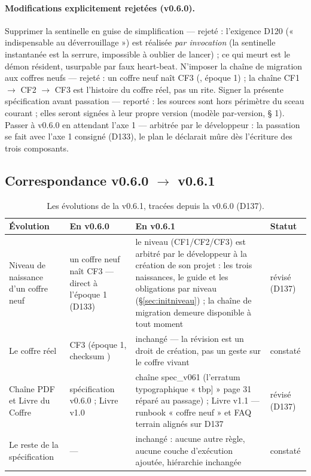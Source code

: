 \paragraph{Modifications explicitement rejetées (v0.6.0).} Supprimer la sentinelle en
 guise de simplification — rejeté : l'exigence D120 (« indispensable au déverrouillage »)
 est réalisée \emph{par invocation} (la sentinelle instantanée est la serrure, impossible
 à oublier de lancer) ; ce qui meurt est le démon résident, usurpable par faux
 heart-beat. N'imposer la chaîne de migration aux coffres neufs — rejeté : un coffre neuf
 naît CF3 (, époque 1) ; la chaîne CF1 $\to$ CF2 $\to$ CF3 est l'histoire du
 coffre réel, pas un rite. Signer la présente spécification avant passation — reporté :
 les sources  sont hors périmètre du sceau courant ; elles seront signées à
 leur propre version (modèle par-version,  § 1). Passer à v0.6.0 en
 attendant l'axe 1 — arbitrée par le développeur : la passation se fait avec l'axe 1
 consigné (D133), le plan le déclarait mûre dès l'écriture des trois composants.

\subsection{Correspondance v0.6.0 $\to$ v0.6.1}\label{sec:evolutions061}

\begin{table}[htbp]
\centering\small
\caption{Les évolutions de la v0.6.1, tracées depuis la v0.6.0 (D137).}
\label{tab:correspondance061}
\begin{tabularx}{\textwidth}{@{}l Y Y l@{}}
\toprule
\textbf{Évolution} & \textbf{En v0.6.0} & \textbf{En v0.6.1} & \textbf{Statut} \\
\midrule
Niveau de naissance d'un coffre neuf & un coffre neuf naît CF3 —  direct à
l'époque 1 (D133) & le niveau (CF1/CF2/CF3) est arbitré par le développeur à la création
 de son projet : les trois naissances, le guide et les obligations par niveau
 (§\ref{sec:initniveau}) ; la chaîne de migration demeure disponible à tout moment &
révisé (D137) \\
Le coffre réel & CF3 (époque 1, checksum ) & inchangé — la révision est un
droit de création, pas un geste sur le coffre vivant & constaté \\
Chaîne PDF et Livre du Coffre & spécification v0.6.0 ; Livre v1.0 & chaîne spec\_v061
(l'erratum typographique « tbp] » page 31 réparé au passage) ; Livre v1.1 — runbook
« coffre neuf » et FAQ terrain alignés sur D137 & révisé (D137) \\
Le reste de la spécification & — & inchangé : aucune autre règle, aucune couche
d'exécution ajoutée, hiérarchie inchangée & constaté \\
\bottomrule
\end{tabularx}
\end{table}

